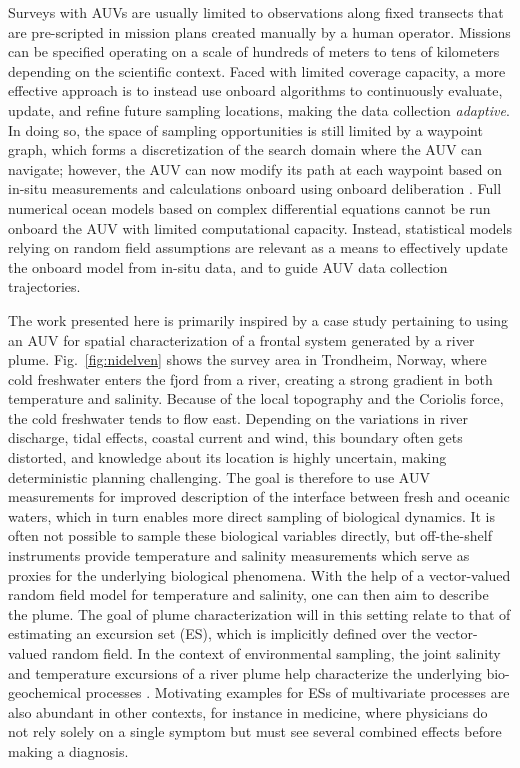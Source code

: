 \documentclass[aoas]{imsart}
\begin{document}
Surveys with AUVs are usually limited to observations along fixed
transects that are pre-scripted in mission plans created manually by a
human operator. Missions can be specified operating on a scale of
hundreds of meters to tens of kilometers depending on the scientific
context. Faced with limited coverage capacity, a more effective
approach is to instead use onboard algorithms to continuously
evaluate, update, and refine future sampling locations, making the
data collection \emph{adaptive}.  In doing so, the space of sampling
opportunities is still limited by a waypoint graph, which forms a
discretization of the search domain where the AUV can navigate;
however, the AUV can now modify its path at each waypoint based on
in-situ measurements and calculations onboard using onboard
deliberation \citep{py10,Rajan12,Rajan12b}.  Full numerical ocean
models based on complex differential equations cannot be run onboard
the AUV with limited computational capacity. Instead, statistical models
relying on random field assumptions are relevant as a means to
effectively update the onboard model from in-situ data, and to guide
AUV data collection trajectories.

The work presented here is primarily inspired by a case study
pertaining to using an AUV for spatial characterization of a frontal
system generated by a river plume. Fig.~\ref{fig:nidelven} shows the
survey area in Trondheim, Norway, where cold freshwater enters the fjord from a river, creating a strong gradient in both temperature and
salinity. Because of the local topography and the Coriolis force, the
cold freshwater tends to flow east. Depending on the variations in
river discharge, tidal effects, coastal current and wind, this
boundary often gets distorted, and knowledge about its location is
highly uncertain, making deterministic planning challenging. The goal
is therefore to use AUV measurements for improved description of the
interface between fresh and oceanic waters, which in turn enables more direct sampling of biological dynamics. It is often not possible
to sample these biological variables directly, but off-the-shelf instruments provide temperature and
salinity measurements which serve as proxies for the underlying
biological phenomena. With the help of a vector-valued random field
model for temperature and salinity, one can then aim to describe the
plume. The goal of plume characterization will in this setting relate to that of estimating an excursion set (ES), which is implicitly defined over the vector-valued random field. 
In the context of environmental sampling, the joint salinity and
temperature excursions of a river plume help characterize the
underlying bio-geochemical processes
\citep{hopkins2013detection,Pinto2018}. Motivating examples for ESs of
multivariate processes are also abundant in other contexts, for
instance in medicine, where physicians do not rely solely on a single
symptom but must see several combined effects before making a
diagnosis.
\end{document}
